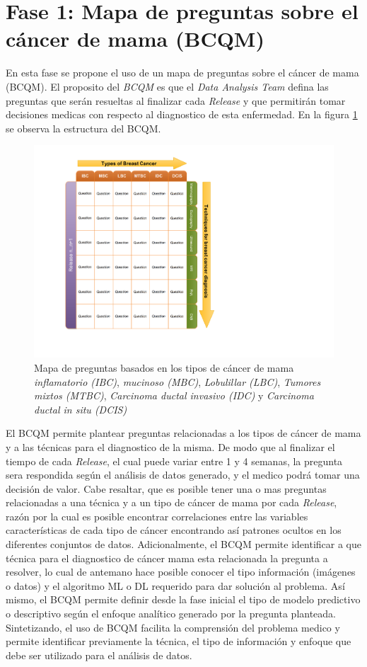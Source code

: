 \newpage
\section{Fase 1: Mapa de preguntas sobre el cáncer de mama (BCQM)} 
En esta fase se propone el uso de un mapa de preguntas sobre el cáncer de mama (BCQM). El proposito del \textit{BCQM} es que el \textit{Data Analysis Team} defina las preguntas que serán resueltas al finalizar cada \textit{Release} y que permitirán tomar decisiones medicas con respecto al diagnostico de esta enfermedad. En la figura \ref{BCQM} se observa la estructura del BCQM.

\begin{figure}[!htb]
	\centering
	\includegraphics[width=0.6
	\linewidth]{IMAGENES/BCQM}
	\caption{Mapa de preguntas basados en los tipos de cáncer de mama \textit{inflamatorio (IBC)}, \textit{mucinoso (MBC)}, \textit{Lobulillar (LBC)}, \textit{Tumores mixtos (MTBC)}, \textit{Carcinoma ductal invasivo (IDC)} y \textit{Carcinoma ductal in situ (DCIS)}}
	\label{BCQM}
\end{figure}

El BCQM permite plantear preguntas relacionadas a los tipos de cáncer de mama y a las técnicas para el diagnostico de la misma. De modo que al finalizar el tiempo de cada \textit{Release}, el cual puede variar entre 1 y 4 semanas, la pregunta sera respondida según el análisis de datos generado, y el medico podrá tomar una decisión de valor. Cabe resaltar, que es posible tener una o mas preguntas relacionadas a una técnica y a un tipo de cáncer de mama por cada \textit{Release}, razón por la cual es posible encontrar correlaciones entre las variables características de cada tipo de cáncer encontrando así patrones ocultos en los diferentes conjuntos de datos. Adicionalmente, el BCQM permite identificar a que técnica para el diagnostico de cáncer mama esta relacionada la pregunta a resolver, lo cual de antemano hace posible conocer el tipo información (imágenes o datos) y el algoritmo  ML o DL requerido para dar solución al problema. Así mismo, el BCQM permite definir desde la fase inicial el tipo de modelo predictivo o descriptivo según el enfoque analítico generado por la pregunta planteada. Sintetizando, el uso de BCQM facilita la comprensión del problema medico y permite identificar previamente la técnica, el tipo de información y enfoque que debe ser utilizado para el análisis de datos.  

